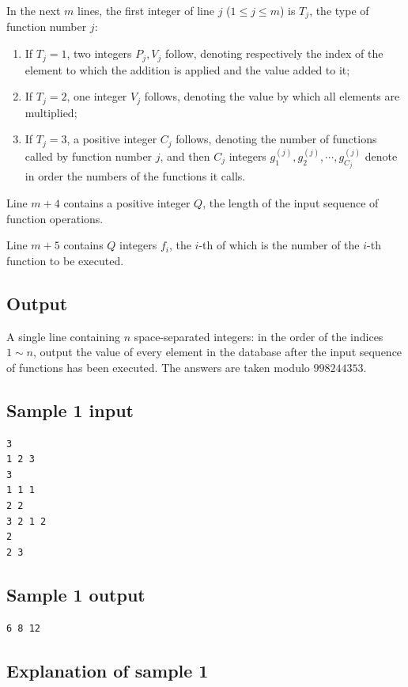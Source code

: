 \documentclass[11pt]{article}
\begin{document}
In the next $m$ lines, the first integer of line $j$ ($1 \le j \le m$) is
$T_j$, the type of function number $j$:
\begin{enumerate}
\item If $T_j = 1$, two integers $P_j, V_j$ follow, denoting respectively the
  index of the element to which the addition is applied and the value added
  to it;
\item If $T_j = 2$, one integer $V_j$ follows, denoting the value by which all
  elements are multiplied;
\item If $T_j = 3$, a positive integer $C_j$ follows, denoting the number of
  functions called by function number $j$,
  and then $C_j$ integers $g^{(j)}_1, g^{(j)}_2, \cdots, g^{(j)}_{C_j}$
  denote in order the numbers of the functions it calls.
\end{enumerate}

Line $m + 4$ contains a positive integer $Q$, the length of the input
sequence of function operations.

Line $m + 5$ contains $Q$ integers $f_i$, the $i$-th of which is the number
of the $i$-th function to be executed.

\subsection*{Output}

A single line containing $n$ space-separated integers:
in the order of the indices $1 \sim n$, output the value of every element in
the database after the input sequence of functions has been executed.
The answers are taken modulo $998244353$.

\subsection*{Sample 1 input}

\begin{verbatim}
3
1 2 3
3
1 1 1
2 2
3 2 1 2
2
2 3
\end{verbatim}

\subsection*{Sample 1 output}

\begin{verbatim}
6 8 12
\end{verbatim}

\subsection*{Explanation of sample 1}
\end{document}
